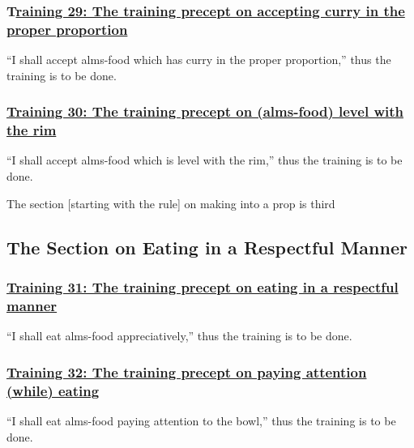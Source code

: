 \subsubsection*{T\hyperref[sekh29]{raining 29: The training precept on accepting curry in the proper proportion}}
\label{training29}
``I shall accept alms-food which has curry in the proper proportion,'' thus the training is to be done.



\subsubsection*{\hyperref[sekh30]{Training 30: The training precept on (alms-food) level with the rim}}
\label{training30}
``I shall accept alms-food which is level with the rim,'' thus the training is to be done.

\begin{center}
	The section [starting with the rule] on making into a prop is third
\end{center}



\setsubsecheadstyle{\subsectionFmt}
\subsection{The Section on Eating in a Respectful Manner}
\ifafiveversion\vspace{0.2cm}\fi
\ifninebythirteenversion\vspace{0.15cm}\fi

\subsubsection*{\hyperref[sekh31]{Training 31: The training precept on eating in a respectful manner}}
\label{training31}
``I shall eat alms-food appreciatively,'' thus the training is to be done.



\subsubsection*{\hyperref[sekh32]{Training 32: The training precept on paying attention (while) eating}}
\label{training32}
``I shall eat alms-food paying attention to the bowl,'' thus the training is to be done.



